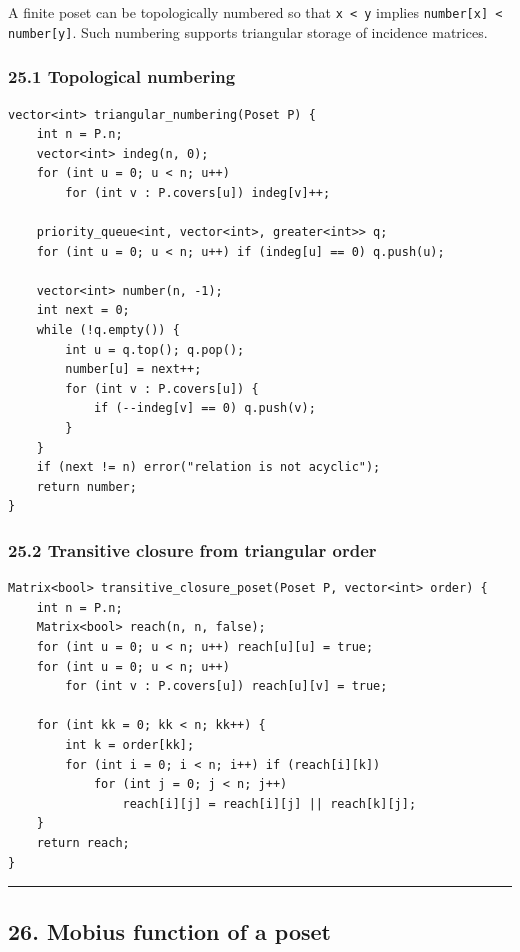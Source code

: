 \documentclass[11pt]{article}
\begin{document}
A finite poset can be topologically numbered so that \texttt{x < y} implies \texttt{number[x] < number[y]}. Such numbering supports triangular storage of incidence matrices.

\subsubsection{25.1 Topological numbering}\label{topological-numbering}

\begin{verbatim}
vector<int> triangular_numbering(Poset P) {
    int n = P.n;
    vector<int> indeg(n, 0);
    for (int u = 0; u < n; u++)
        for (int v : P.covers[u]) indeg[v]++;

    priority_queue<int, vector<int>, greater<int>> q;
    for (int u = 0; u < n; u++) if (indeg[u] == 0) q.push(u);

    vector<int> number(n, -1);
    int next = 0;
    while (!q.empty()) {
        int u = q.top(); q.pop();
        number[u] = next++;
        for (int v : P.covers[u]) {
            if (--indeg[v] == 0) q.push(v);
        }
    }
    if (next != n) error("relation is not acyclic");
    return number;
}
\end{verbatim}

\subsubsection{25.2 Transitive closure from triangular order}\label{transitive-closure-from-triangular-order}

\begin{verbatim}
Matrix<bool> transitive_closure_poset(Poset P, vector<int> order) {
    int n = P.n;
    Matrix<bool> reach(n, n, false);
    for (int u = 0; u < n; u++) reach[u][u] = true;
    for (int u = 0; u < n; u++)
        for (int v : P.covers[u]) reach[u][v] = true;

    for (int kk = 0; kk < n; kk++) {
        int k = order[kk];
        for (int i = 0; i < n; i++) if (reach[i][k])
            for (int j = 0; j < n; j++)
                reach[i][j] = reach[i][j] || reach[k][j];
    }
    return reach;
}
\end{verbatim}

\begin{center}\rule{0.5\linewidth}{0.5pt}\end{center}

\subsection{26. Mobius function of a poset}\label{muxf6bius-function-of-a-poset}
\end{document}
